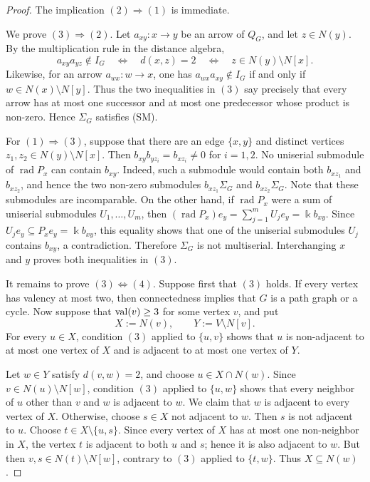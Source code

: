 \documentclass[a4paper,leqno]{amsart}
\begin{document}
\begin{proof}
The implication $(2)\Rightarrow(1)$ is immediate.

We prove $(3)\Rightarrow(2)$. Let $a_{xy}:x\to y$ be an arrow of $Q_G$, and let $z\in N(y)$. By the multiplication rule in the distance algebra,
$$a_{xy}a_{yz}\notin I_G
\quad\Longleftrightarrow\quad
d(x,z)=2
\quad\Longleftrightarrow\quad
z\in N(y)\setminus N[x].$$
Likewise, for an arrow $a_{wx}:w\to x$, one has
$a_{wx}a_{xy}\notin I_G$ if and only if $w\in N(x)\setminus N[y]$.
Thus the two inequalities in $(3)$ say precisely that every arrow has at most one successor and at most one predecessor whose product is non-zero. Hence $\Sigma_G$ satisfies (SM).

For $(1)\Rightarrow(3)$, suppose that there are an edge $\{x,y\}$ and
distinct vertices $z_1,z_2\in N(y)\setminus N[x]$. Then
$b_{xy}b_{yz_i}=b_{xz_i}\neq0$ for $i=1,2$. No uniserial submodule of $\operatorname{rad}P_x$ can contain $b_{xy}$. Indeed, such a submodule would contain both $b_{xz_1}$ and $b_{xz_2}$, and hence the two non-zero submodules $b_{xz_1}\Sigma_G$ and $b_{xz_2}\Sigma_G$. Note that these submodules are incomparable. On the other hand, if $\operatorname{rad}P_x$ were a sum of uniserial submodules $U_1,\ldots,U_m$, then $(\operatorname{rad}P_x)e_y=\sum_{j=1}^m U_je_y=\Bbbk b_{xy}$. Since $U_je_y\subseteq P_xe_y=\Bbbk b_{xy}$, this equality shows that one of the uniserial submodules $U_j$ contains $b_{xy}$, a contradiction. Therefore $\Sigma_G$ is not multiserial. Interchanging $x$ and $y$ proves both inequalities in $(3)$.

It remains to prove $(3)\Longleftrightarrow(4)$. Suppose first that $(3)$ holds. If every vertex has valency at most two, then connectedness implies that $G$ is a path graph or a cycle. Now suppose that $\operatorname{val}(v)\geq3$ for some vertex $v$, and put
$$X:=N(v),\qquad Y:=V\setminus N[v].$$
For every $u\in X$, condition $(3)$ applied to $\{u,v\}$ shows that $u$ is non-adjacent to at most one vertex of $X$ and is adjacent to at most one vertex of $Y$.

Let $w\in Y$ satisfy $d(v,w)=2$, and choose $u\in X\cap N(w)$. Since $v\in N(u)\setminus N[w]$,
condition $(3)$ applied to $\{u,w\}$ shows that every neighbor of $u$ other than $v$ and $w$ is adjacent to $w$. We claim that $w$ is adjacent to every vertex of $X$. Otherwise, choose $s\in X$ not adjacent to $w$. Then $s$ is not adjacent to $u$. Choose $t\in X\setminus\{u,s\}$. Since every vertex of $X$ has at most one non-neighbor in $X$, the vertex $t$ is adjacent to both $u$ and $s$; hence it is also adjacent to $w$. But then $v,s\in N(t)\setminus N[w]$, contrary to $(3)$ applied to $\{t,w\}$. Thus $X\subseteq N(w)$.


\end{proof}
\end{document}
